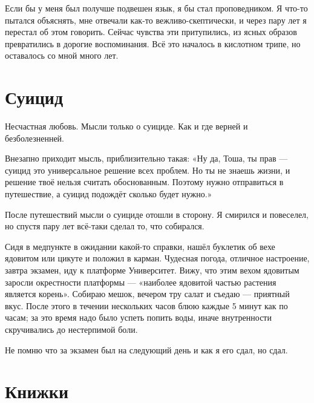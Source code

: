 \documentclass{book}
\begin{document}
Если бы у меня был получше подвешен язык, я бы стал проповедником.
Я что-то пытался объяснять, мне отвечали как-то вежливо-скептически, и через пару лет я перестал об этом говорить.
Сейчас чувства эти притупились, из ясных образов превратились в дорогие воспоминания.
Всё это началось в кислотном трипе, но оставалось со мной много лет.

\section*{Суицид}
Несчастная любовь.
Мысли только о суициде.
Как и где верней и безболезненней.

Внезапно приходит мысль, приблизительно такая:
«Ну да, Тоша, ты прав --- суицид это универсальное решение всех проблем.
Но ты не знаешь жизни, и решение твоё нельзя считать обоснованным.
Поэтому нужно отправиться в путешествие, а суицид подождёт сколько будет нужно.»

После путешествий мысли о суициде отошли в сторону.
Я смирился и повеселел, но спустя пару лет всё-таки сделал то, что собирался.

Сидя в медпункте в ожидании какой-то справки, нашёл буклетик об вехе ядовитом или цикуте и положил в карман.
Чудесная погода, отличное настроение, завтра экзамен, иду к платформе Университет.
Вижу, что этим вехом ядовитым заросли окрестности платформы --- «наиболее ядовитой частью растения является корень».
Собираю мешок, вечером тру салат и съедаю --- приятный вкус.
После этого в течении нескольких часов блюю каждые 5 минут как по часам;
за это время надо было успеть попить воды, иначе внутренности скручивались до нестерпимой боли.

Не помню что за экзамен был на следующий день и как я его сдал, но сдал.

\section*{Книжки}
\end{document}
